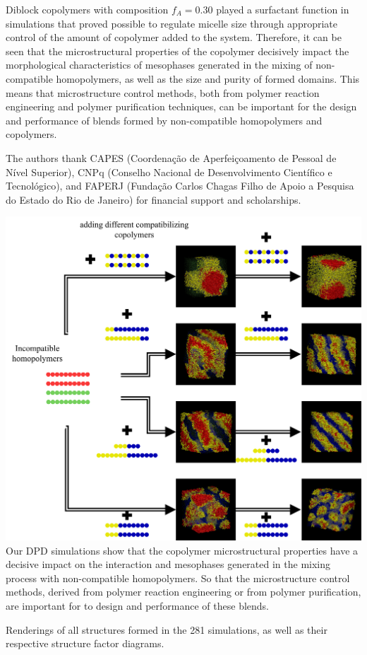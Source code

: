 \documentclass[
journal=mamobx,
manuscript=article,
]{achemso}
\begin{document}
Diblock copolymers with composition $f_A=0.30$ played a surfactant function in simulations that proved possible to regulate micelle size through appropriate control of the amount of copolymer added to the system.
Therefore, it can be seen that the microstructural properties of the copolymer decisively impact the morphological characteristics of mesophases generated in the mixing of non-compatible homopolymers, as well as the size and purity of formed domains.
This means that microstructure control methods, both from polymer reaction engineering and polymer purification techniques, can be important for the design and performance of blends formed by non-compatible homopolymers and copolymers. 

\begin{acknowledgement}

The authors thank CAPES (Coordena\c{c}\~ao de Aperfei\c{c}oamento de Pessoal de N\'ivel Superior), CNPq (Conselho Nacional de Desenvolvimento Cient\'ifico e Tecnol\'ogico), and FAPERJ (Funda\c{c}\~ao Carlos Chagas Filho de Apoio a Pesquisa do Estado do Rio de Janeiro) for financial support and scholarships.

\end{acknowledgement}



\begin{tocentry}
	\includegraphics[width=\linewidth]{ToCfigure}
	Our DPD simulations show that the copolymer microstructural properties have a decisive impact on the interaction and mesophases generated in the mixing process with non-compatible homopolymers.
	So that the microstructure control methods, derived from polymer reaction engineering or from polymer purification, are important for to design and performance of these blends.
\end{tocentry}

\begin{suppinfo}
Renderings of all structures formed in the 281 simulations, as well as their respective structure factor diagrams.
\end{suppinfo}
\end{document}
